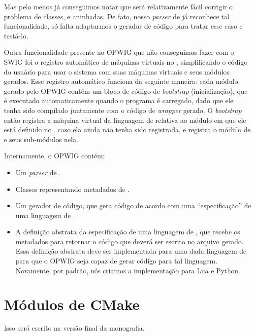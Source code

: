   Mas pelo menos já conseguimos notar que será relativamente fácil corrigir o problema de classes, 
   e  aninhadas. De fato, nosso \textit{parser} de \CXX{} já reconhece
  tal funcionalidade, só falta adaptarmos o gerador de código para tratar esse caso e testá-lo.
  
  Outra funcionalidade presente no OPWIG que não conseguimos fazer com o SWIG foi o registro automático
  de máquinas virtuais no \SMgr{}, simplificando o código do usuário para usar o sistema com suas máquinas
  virtuais e seus módulos gerados. Esse registro automático funciona da seguinte maneira: cada módulo gerado
  pelo OPWIG contém um bloco de código de \textit{bootstrap} (inicialização), que é executado automaticamente
  quando o programa é carregado, dado que ele tenha sido compilado juntamente com o código de \textit{wrapper}
  gerado. O \textit{bootstrap} então registra a máquina virtual da linguagem de \script{} relativa ao módulo
  em que ele está definido no \SMgr{}, caso ela ainda não tenha sido registrada, e registra o módulo de
  \script{} e seus sub-módulos nela.
  
  Internamente, o OPWIG contém:
    \cite{flex:00}
  \begin{itemize}
    \item Um \textit{parser} de \CXX{}.
    \item Classes representando metadados de \CXX{}.
    \item Um gerador de código, que gera código de acordo com uma ``especificação''
      de uma linguagem de \script{}.
    \item A definição abstrata da especificação de uma linguagem de \script{}, que recebe
      os metadados para retornar o código que deverá ser escrito no arquivo gerado. Essa
      definição abstrata deve ser implementada para uma dada linguagem de \script{} para
      que o OPWIG seja capaz de gerar código para tal linguagem. Novamente, por padrão, nós
      criamos a implementação para Lua e Python.
  \end{itemize}
 

  \section{Módulos de CMake}
  
    Isso será escrito na versão final da monografia.
